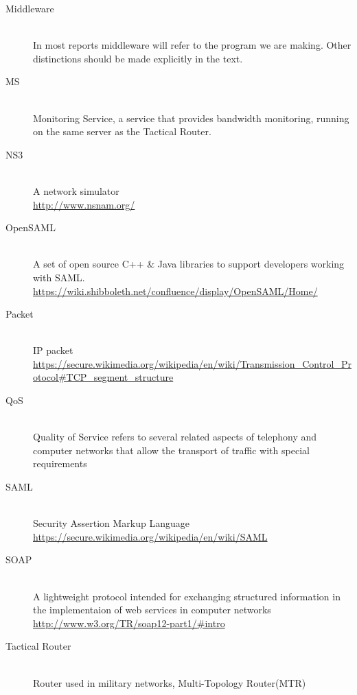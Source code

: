 \begin{description}
\item[Middleware]\label{glossary:middleware} \hfill\\
In most reports middleware will refer to the program we are making. Other distinctions should be made explicitly in the text.

\item[MS]\label{glossary:ms} \hfill\\
Monitoring Service, a service that provides bandwidth monitoring, running on the same server as the Tactical Router.

\item[NS3]\label{glossary:ns3} \hfill\\
A network simulator \\ \url{http://www.nsnam.org/}

\item[OpenSAML]\label{glossary:opensaml} \hfill\\
A set of open source C++ & Java libraries to support developers working with SAML. \\ \url{https://wiki.shibboleth.net/confluence/display/OpenSAML/Home/}

\item[Packet]\label{glossary:packet} \hfill\\
IP packet  \\ \url{https://secure.wikimedia.org/wikipedia/en/wiki/Transmission_Control_Protocol#TCP_segment_structure}

\item[QoS]\label{glossary:qos} \hfill\\
Quality of Service refers to several related aspects of telephony and computer networks that allow the transport of traffic with special requirements

\item[SAML]\label{glossary:saml} \hfill\\
Security Assertion Markup Language  \\ \url{https://secure.wikimedia.org/wikipedia/en/wiki/SAML}

\item[SOAP]\label{glossary:soap} \hfill\\
A lightweight protocol intended for exchanging structured information in the implementaion of web services in computer networks \\ \url{http://www.w3.org/TR/soap12-part1/#intro}

\item[Tactical Router]\label{glossary:tactical router} \hfill\\
Router used in military networks, Multi-Topology Router(MTR)


\end{description}
